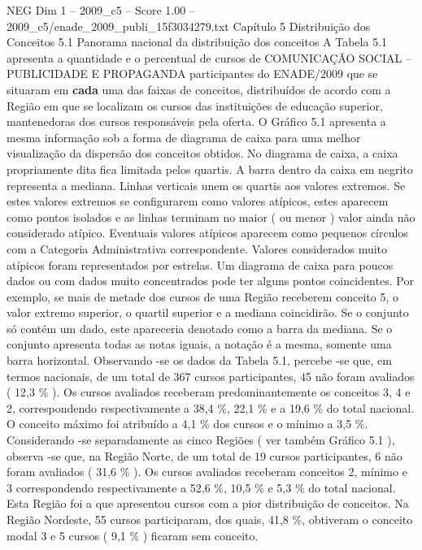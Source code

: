 \begin{textsample}{NEG Dim 1 – 2009\_c5 – Score 1.00 – 2009\_c5/enade\_2009\_publi\_15f3034279.txt}  \label{ex:f1_neg_294}
Capítulo 5 Distribuição dos Conceitos 5.1 Panorama nacional da distribuição dos conceitos A Tabela 5.1 apresenta a quantidade e o percentual de cursos de COMUNICAÇÃO SOCIAL – PUBLICIDADE E PROPAGANDA participantes do ENADE/2009 que se situaram em \textbf{cada} uma das faixas de conceitos, distribuídos de acordo com a Região em que se localizam os cursos das instituições de educação superior, mantenedoras dos cursos responsáveis pela oferta.
O Gráfico 5.1 apresenta a mesma informação sob a forma de diagrama de caixa para uma melhor visualização da dispersão dos conceitos obtidos.
No diagrama de caixa, a caixa propriamente dita fica limitada pelos quartis.
A barra dentro da caixa em negrito representa a mediana.
Linhas verticais unem os quartis aos valores extremos.
Se estes valores extremos se configurarem como valores atípicos, estes aparecem como pontos isolados e as linhas terminam no maior ( ou menor ) valor ainda não considerado atípico.
Eventuais valores atípicos aparecem como pequenos círculos com a Categoria Administrativa correspondente.
Valores considerados muito atípicos foram representados por estrelas.
Um diagrama de caixa para poucos dados ou com dados muito concentrados pode ter alguns pontos coincidentes.
Por exemplo, se mais de metade dos cursos de uma Região receberem conceito 5, o valor extremo superior, o quartil superior e a mediana coincidirão.
Se o conjunto só contém um dado, este apareceria denotado como a barra da mediana.
Se o conjunto apresenta todas as notas iguais, a notação é a mesma, somente uma barra horizontal.
Observando -se os dados da Tabela 5.1, percebe -se que, em termos nacionais, de um total de 367 cursos participantes, 45 não foram avaliados ( 12,3 \% ).
Os cursos avaliados receberam predominantemente os conceitos 3, 4 e 2, correspondendo respectivamente a 38,4 \%, 22,1 \% e a 19,6 \% do total nacional.
O conceito máximo foi atribuído a 4,1 \% dos cursos e o mínimo a 3,5 \%.
Considerando -se separadamente as cinco Regiões ( ver também Gráfico 5.1 ), observa -se que, na Região Norte, de um total de 19 cursos participantes, 6 não foram avaliados ( 31,6 \% ).
Os cursos avaliados receberam conceitos 2, mínimo e 3 correspondendo respectivamente a 52,6 \%, 10,5 \% e 5,3 \% do total nacional.
Esta Região foi a que apresentou cursos com a pior distribuição de conceitos.
Na Região Nordeste, 55 cursos participaram, dos quais, 41,8 \%, obtiveram o conceito modal 3 e 5 cursos ( 9,1 \% ) ficaram sem conceito.

\end{textsample}
